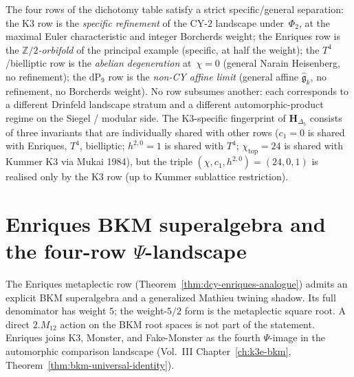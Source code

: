 \begin{remark}
\label{rem:dcy-specific-vs-general}
The four rows of the dichotomy table satisfy a strict
specific/general separation: the K3 row is the \emph{specific
refinement} of the CY-$2$ landscape under~$\Phi_2$, at the maximal
Euler characteristic and integer Borcherds weight; the Enriques
row is the \emph{$\mathbb{Z}/2$-orbifold} of the principal example (specific,
at half the weight); the $T^4$/bielliptic row is the \emph{abelian
degeneration} at~$\chi = 0$ (general Narain Heisenberg, no
refinement); the $\mathrm{dP}_9$ row is the \emph{non-CY affine
limit} (general affine $\widehat{\mathfrak{g}}_k$, no refinement,
no Borcherds weight). No row subsumes another: each corresponds to
a different Drinfeld landscape stratum and a different
automorphic-product regime on the Siegel / modular side. The
K3-specific fingerprint of $\mathbf{H}_{\Delta_5}$ consists of
three invariants that are individually shared with other rows
($c_1 = 0$ is shared with Enriques, $T^4$, bielliptic; $h^{2,0} = 1$
is shared with $T^4$; $\chi_{\mathrm{top}} = 24$ is shared with
Kummer K3 via Mukai 1984), but the triple $(\chi, c_1, h^{2,0}) =
(24, 0, 1)$ is realised only by the K3 row (up to Kummer
sublattice restriction).
\end{remark}

\section{Enriques BKM superalgebra and the four-row \texorpdfstring{$\Psi$}{Psi}-landscape}
\label{sec:dcy-enriques-psi-landscape}

The Enriques metaplectic row
(Theorem~\ref{thm:dcy-enriques-analogue}) admits an explicit
BKM superalgebra and a generalized Mathieu twining shadow. Its full
denominator has weight \(5\); the weight-\(5/2\) form is the
metaplectic square root. A direct $2.M_{12}$ action on the BKM root
spaces is not part of the statement.
Enriques joins K3, Monster, and Fake-Monster as the fourth $\Psi$-image
in the automorphic comparison landscape
(Vol.~III Chapter~\ref{ch:k3e-bkm},
Theorem~\ref{thm:bkm-universal-identity}).

